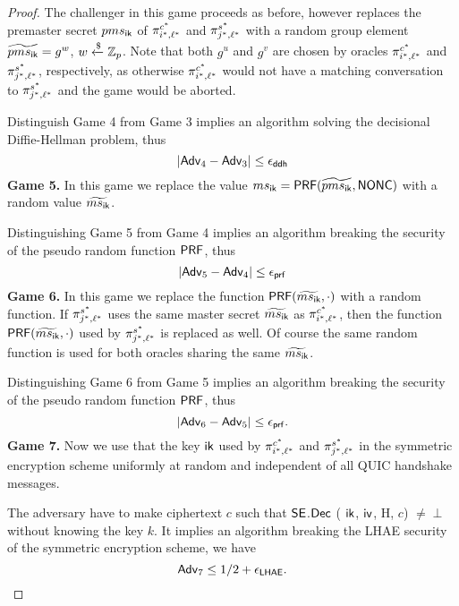 \begin{proof}
 The challenger in this game proceeds as before, however replaces the premaster secret $pms_{\mathsf{ik}}$ of $\pi^{c^{\ast}}_{i^{\ast},\ell^{\ast}}$ and $\pi^{s^{\ast}}_{j^{\ast},\ell^{\ast}}$ with a random group element $\widetilde{pms_{\mathsf{ik}}} = g^w$, $w \xleftarrow{\$} \mathbb{Z}_p$. Note that both $g^u$ and $g^v$ are chosen by oracles $\pi^{c^{\ast}}_{i^{\ast},\ell^{\ast}}$ and $\pi^{s^{\ast}}_{j^{\ast},\ell^{\ast}}$, respectively, as otherwise $\pi^{c^{\ast}}_{i^{\ast},\ell^{\ast}}$ would not have a matching conversation to $\pi^{s^{\ast}}_{j^{\ast},\ell^{\ast}}$ and the game would be aborted.

 Distinguish Game 4 from Game 3 implies an algorithm solving the decisional Diffie-Hellman problem, thus
 \begin{equation}
  |\mathsf{Adv}_{4} - \mathsf{Adv}_{3}| \leq \epsilon_{\mathsf{ddh}}
 \end{equation}%
%
%
 \textbf{Game 5.} In this game we replace the value $ms_{\mathsf{ik}} = \mathsf{PRF}(\widetilde{pms_{\mathsf{ik}}}, \mathsf{NONC})$ with a random value $\widetilde{ms_{\mathsf{ik}}}$.

 Distinguishing Game 5 from Game 4 implies an algorithm breaking the security of the pseudo random function $\mathsf{PRF}$, thus
 \begin{equation}
  |\mathsf{Adv}_{5} - \mathsf{Adv}_{4}| \leq \epsilon_{\mathsf{prf}}
 \end{equation}%
%
%
 \textbf{Game 6.} In this game we replace the function $\mathsf{PRF}(\widetilde{ms_{\mathsf{ik}}},\cdot)$ with a random function. If $\pi^{s^{\ast}}_{j^{\ast},\ell^{\ast}}$ uses the same master secret $\widetilde{ms_{\mathsf{ik}}}$ as $\pi^{c^{\ast}}_{i^{\ast},\ell^{\ast}}$, then the function $\mathsf{PRF}(\widetilde{ms_{\mathsf{ik}}},\cdot)$ used by $\pi^{s^{\ast}}_{j^{\ast},\ell^{\ast}}$ is replaced as well. Of course the same random function is used for both oracles sharing the same $\widetilde{ms_{\mathsf{ik}}}$.

 Distinguishing Game 6 from Game 5 implies an algorithm breaking the security of the pseudo random function $\mathsf{PRF}$, thus
 \begin{equation}
  |\mathsf{Adv}_6 - \mathsf{Adv}_5| \leq \epsilon_{\mathsf{prf}}.
 \end{equation}%
%
%
 \textbf{Game 7.} Now we use that the key $\mathsf{ik}$ used by $\pi^{c^{\ast}}_{i^{\ast},\ell^{\ast}}$ and $\pi^{s^{\ast}}_{j^{\ast},\ell^{\ast}}$ in the symmetric encryption scheme uniformly at random and independent of all QUIC handshake messages.

 The adversary have to make ciphertext $c$ such that $\mathsf{SE}$.$\mathsf{Dec}$ ( $\mathsf{ik}$, $\mathsf{iv}$, H, $c$) $\neq \perp$ without knowing the key $k$. It implies an algorithm breaking the LHAE security of the symmetric encryption scheme, we have
 \begin{equation}
  \mathsf{Adv}_7 \leq 1/2 + \epsilon_{\mathsf{LHAE}}.
 \end{equation}%
\end{proof}